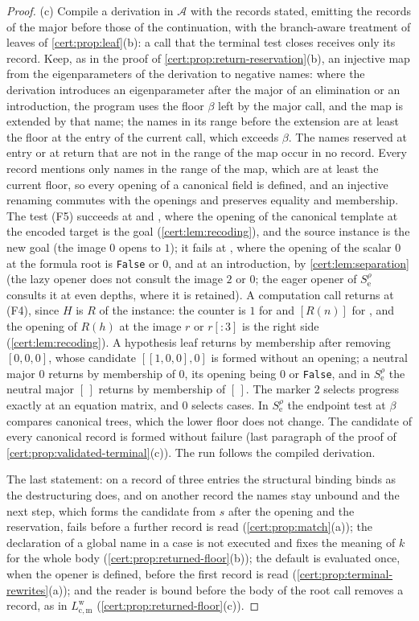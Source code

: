 \begin{proof}
(c) Compile a derivation in $\mathcal A$ with the records stated, emitting the records
of the major before those of the continuation, with the branch-aware treatment of
leaves of \cref{cert:prop:leaf}(b): a call that the terminal test closes receives only
its record. Keep, as in the proof of \cref{cert:prop:return-reservation}(b), an
injective map from the eigenparameters of the derivation to negative names: where the
derivation introduces an eigenparameter after the major of an elimination or an
introduction, the program uses the floor $\beta$ left by the major call, and the map
is extended by that name; the names in its range before the extension are at least
the floor at the entry of the current call, which exceeds $\beta$. The names reserved
at entry or at return that are not in the range of the map occur in no record. Every
record mentions only names in the range of the map, which are at least the current
floor, so every opening of a canonical field is defined, and an injective renaming
commutes with the openings and preserves equality and membership. The test (F5)
succeeds at  and , where the opening of the canonical template
at the encoded target is the goal (\cref{cert:lem:recoding}), and the source instance
is the new goal (the image $0$ opens to $1$); it fails at , where the
opening of the scalar $0$ at the formula root is \texttt{False} or $0$, and at an
introduction, by \cref{cert:lem:separation} (the lazy opener does not consult the
image $2$ or $0$; the eager opener of $S^{\rho}_{\mathrm e}$ consults it at even depths,
where it is retained). A computation call returns at (F4), since $H$ is $R$ of the
instance: the counter is $1$ for  and $[R(n)]$ for , and the
opening of $R(h)$ at the image $r$ or $r[{:}3]$ is the right side
(\cref{cert:lem:recoding}). A hypothesis leaf returns by membership after removing
$[0,0,0]$, whose candidate $[[1,0,0],0]$ is formed without an opening; a neutral major
$0$ returns by membership of $0$, its opening being $0$ or \texttt{False}, and in
$S^{\rho}_{\mathrm e}$ the neutral major $[\,]$ returns by membership of $[\,]$. The marker
$2$ selects progress exactly at an equation matrix, and $0$ selects cases. In
$S^{\rho}_{\mathrm e}$ the endpoint test at $\beta$ compares canonical trees, which the
lower floor does not change. The candidate of every canonical record is formed
without failure (last paragraph of the proof of
\cref{cert:prop:validated-terminal}(c)). The run follows the compiled derivation.

The last statement: on a record of three entries the structural binding binds as the
destructuring does, and on another record the names stay unbound and the next step,
which forms the candidate from $s$ after the opening and the reservation, fails before
a further record is read (\cref{cert:prop:match}(a)); the declaration of a global name
in a case is not executed and fixes the meaning of $k$ for the whole body
(\cref{cert:prop:returned-floor}(b)); the default is evaluated once, when the opener
is defined, before the first record is read (\cref{cert:prop:terminal-rewrites}(a));
and the reader is bound before the body of the root call removes a record, as in
$L^{\mathrm w}_{\mathrm{c,m}}$ (\cref{cert:prop:returned-floor}(c)).
\end{proof}

